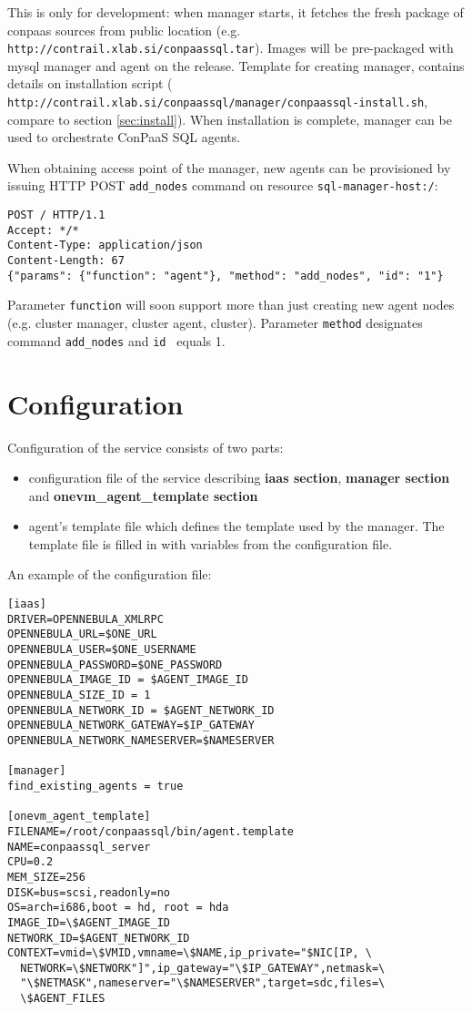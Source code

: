 \documentclass[a4paper,10pt]{article}
\begin{document}
This is only for development: when manager starts, it fetches the fresh package of conpaas sources from public location (e.g. \\{\tt http://contrail.xlab.si/conpaassql.tar}). Images will be pre-packaged with mysql manager and agent on the release. Template for creating manager, contains details on installation script (\\{\tt http://contrail.xlab.si/conpaassql/manager/conpaassql-install.sh}, compare to section \ref{sec:install}). When installation is complete, manager can be used to orchestrate ConPaaS SQL agents.

When obtaining access point of the manager, new agents can be provisioned by issuing HTTP POST {\tt add\_nodes} command on resource {\tt sql-manager-host:/}:

\begin{verbatim}
POST / HTTP/1.1
Accept: */*
Content-Type: application/json
Content-Length: 67
{"params": {"function": "agent"}, "method": "add_nodes", "id": "1"}
\end{verbatim}

Parameter {\tt function} will soon support more than just creating new agent nodes (e.g. cluster manager, cluster agent, cluster). Parameter {\tt method} designates command {\tt add\_nodes} and {\tt id } equals 1. 

\section{Configuration}

Configuration of the service consists of two parts:
\begin{itemize}
	\item configuration file of the service describing {\bf iaas section}, {\bf manager section} and {\bf onevm\_agent\_template section}
	\item agent's template file which defines the template used by the manager. The template file is filled in with variables from the configuration file.
\end{itemize}

An example of the configuration file:

\begin{Verbatim}[frame=single]
[iaas]
DRIVER=OPENNEBULA_XMLRPC
OPENNEBULA_URL=$ONE_URL
OPENNEBULA_USER=$ONE_USERNAME
OPENNEBULA_PASSWORD=$ONE_PASSWORD
OPENNEBULA_IMAGE_ID = $AGENT_IMAGE_ID
OPENNEBULA_SIZE_ID = 1
OPENNEBULA_NETWORK_ID = $AGENT_NETWORK_ID
OPENNEBULA_NETWORK_GATEWAY=$IP_GATEWAY
OPENNEBULA_NETWORK_NAMESERVER=$NAMESERVER

[manager]
find_existing_agents = true

[onevm_agent_template]
FILENAME=/root/conpaassql/bin/agent.template
NAME=conpaassql_server
CPU=0.2
MEM_SIZE=256
DISK=bus=scsi,readonly=no
OS=arch=i686,boot = hd, root = hda
IMAGE_ID=\$AGENT_IMAGE_ID
NETWORK_ID=$AGENT_NETWORK_ID
CONTEXT=vmid=\$VMID,vmname=\$NAME,ip_private="$NIC[IP, \
  NETWORK=\$NETWORK"]",ip_gateway="\$IP_GATEWAY",netmask=\
  "\$NETMASK",nameserver="\$NAMESERVER",target=sdc,files=\
  \$AGENT_FILES
\end{Verbatim}
\end{document}
